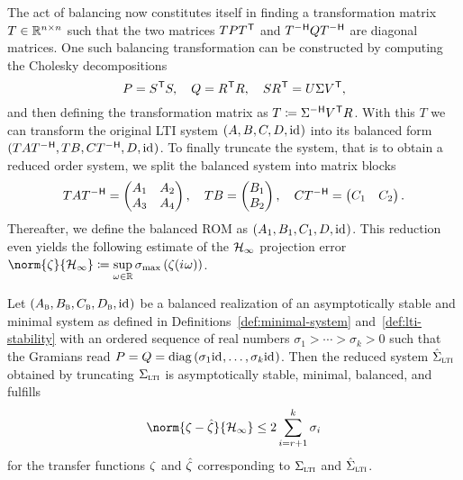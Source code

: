 
The act of balancing now constitutes itself in finding a transformation matrix $T \in \mathbb{R}^{n \times n}$ such that the two matrices $T P T^{\mkern1mu \mathsf{T}}$ and $T\inv[T] Q T\inv$ are diagonal matrices.
One such balancing transformation can be constructed by computing the Cholesky decompositions
\begin{equation}\label{eq:balancing}
    P = S^{\mkern1mu \mathsf{T}} S,\quad Q = R^{\mkern1mu \mathsf{T}} R,\quad S R^{\mkern1mu \mathsf{T}} = U \Sigma V^{\mkern1mu \mathsf{T}},
\end{equation}
and then defining the transformation matrix as $T \coloneqq \Sigma\inv[\frac{1}{2}] V\trans R$.
With this $T$ we can transform the original \ac{LTI} system $(A, B, C, D, \text{id}_{})$ into its balanced form $(T A T\inv, T B, C T\inv, D, \id)$.
To finally truncate the system, that is to obtain a reduced order system, we split the balanced system into matrix blocks
\begin{equation*}
    T A T\inv = \begin{pmatrix}
        A_1 & A_2 \\
        A_3 & A_4
    \end{pmatrix},\quad T B = \begin{pmatrix}
        B_1 \\
        B_2
    \end{pmatrix},\quad C T\inv = \begin{pmatrix}
        C_1 & C_2
    \end{pmatrix}.
\end{equation*}
Thereafter, we define the balanced \ac{ROM} as $(A_1, B_1, C_1, D, \text{id}_{})$.
This reduction even yields the following estimate of the $\mathcal{H}_\infty$ projection error $\norm{\tfunc}{\mcl{H}_\infty} \coloneqq \sup\limits_{\omega \in \bb{R}} \sigma_{\max} \left( \tfunc(\iu \omega) \right)$.

\begin{theorem}\label{thm:h-inf-error}
    Let $(A_{\textnormal{\scshape b}}, B_{\textnormal{\scshape b}}, C_{\textnormal{\scshape b}}, D_{\textnormal{\scshape b}}, \text{id}_{})$ be a balanced realization of an asymptotically stable and minimal system as defined in Definitions~\ref{def:minimal-system} and~\ref{def:lti-stability} with an ordered sequence of real numbers $\sigma_1 > \cdots > \sigma_k > 0$ such that the Gramians read $P = Q = \mathop{}\!\mathrm{diag}\left(\sigma_1 \text{id}_{}, \dots, \sigma_k \text{id}_{}\right)$.
    Then the reduced system $\hat{\Sigma}_{\textnormal{\scshape lti}}$ obtained by truncating $\Sigma_{\textnormal{\scshape lti}}$ is asymptotically stable, minimal, balanced, and fulfills
    \begin{equation*}
        \norm{\tfunc - \hat{\tfunc}}{\mcl{H}_\infty} \leq 2 \sum\limits_{i = r + 1}^k \sigma_i
    \end{equation*}
    for the transfer functions $\zeta$ and $\hat{\zeta}$ corresponding to $\Sigma_{\textnormal{\scshape lti}}$ and $\hat{\Sigma}_{\textnormal{\scshape lti}}$.
\end{theorem}

